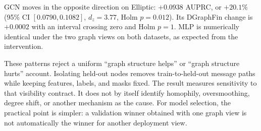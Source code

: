 GCN moves in the opposite direction on Elliptic: $+0.0938$ AUPRC, or $+20.1\%$ (95\% CI $[0.0790,0.1082]$, $d_z=3.77$, Holm $p=0.012$). Its DGraphFin change is $+0.0002$ with an interval crossing zero and Holm $p=1$. MLP is numerically identical under the two graph views on both datasets, as expected from the intervention.

These patterns reject a uniform ``graph structure helps'' or ``graph structure hurts'' account. Isolating held-out nodes removes train-to-held-out message paths while keeping features, labels, and masks fixed. The result measures sensitivity to that visibility contract. It does not by itself identify homophily, oversmoothing, degree shift, or another mechanism as the cause. For model selection, the practical point is simpler: a validation winner obtained with one graph view is not automatically the winner for another deployment view.
